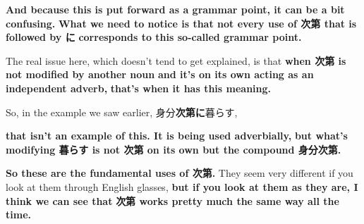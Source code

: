 \thinrule

{\bf And because this is put forward as a grammar point, it can be a bit confusing.} {\bf What we need to notice is that not every use of 次第 that is followed by に} {\bf corresponds to this so-called grammar point.}

The real issue here, which doesn't tend to get explained, is that\crlf
{\bf when 次第 is not modified by another noun} {\bf and it's on its own acting as an independent adverb,} {\bf that's when it has this meaning.}

So, in the example we saw earlier, 身分{\bf 次第に}暮らす,

{}

{\bf that isn't an example of this. It is being used adverbially,} {\bf but what's modifying 暮らす is not 次第 on its own but the compound 身分次第.}

\thinrule

{\bf So these are the fundamental uses of 次第.} They seem very different if you look at them through English glasses, {\bf but if you look at them as they are, I think we can see that} {\bf 次第 works pretty much the same way all the time.}

{}

\stopsectionlevel

\stopsectionlevel
